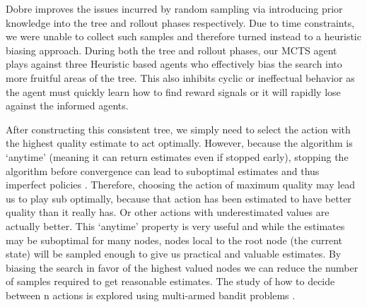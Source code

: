\documentclass[msc, deptreport, ai, romanprepages]{infthesis}
\begin{document}
Dobre improves the issues incurred by random sampling via introducing prior knowledge into the tree and rollout phases respectively. Due to time constraints, we were unable to collect such samples and therefore turned instead to a heuristic biasing approach. During both the tree and rollout phases, our MCTS agent plays against three Heuristic based agents who effectively bias the search into more fruitful areas of the tree. This also inhibits cyclic or ineffectual behavior as the agent must quickly learn how to find reward signals or it will rapidly lose against the informed agents.

After constructing this consistent tree, we simply need to select the action with the highest quality estimate to act optimally. However, because the algorithm is ‘anytime’ (meaning it can return estimates even if stopped early), stopping the algorithm before convergence can lead to suboptimal estimates and thus imperfect policies \cite{Gelly}. Therefore, choosing the action of maximum quality may lead us to play sub optimally, because that action has been estimated to have better quality than it really has. Or other actions with underestimated values are actually better. This ‘anytime’ property is very useful and while the estimates may be suboptimal for many nodes, nodes local to the root node (the current state) will be sampled enough to give us practical and valuable estimates. By biasing the search in favor of the highest valued nodes we can reduce the number of samples required to get reasonable estimates. The study of how to decide between n actions is explored using multi-armed bandit problems \cite{Gelly}. 
\end{document}
